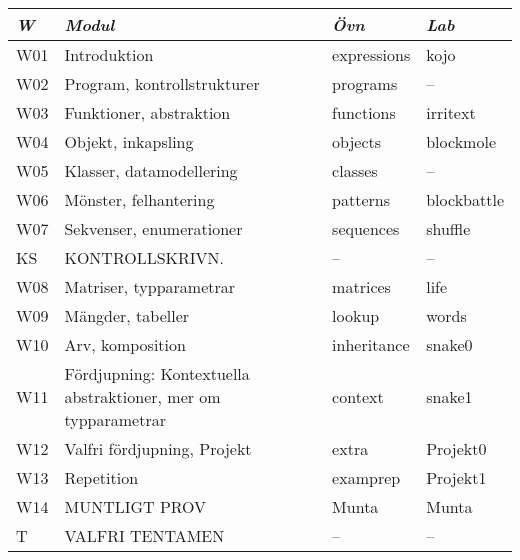 \begin{tabular}{l|l|l|l}
\textit{W} & \textit{Modul} & \textit{Övn} & \textit{Lab} \\ \hline \hline
W01 & Introduktion & expressions & kojo \\
W02 & Program, kontrollstrukturer & programs & -- \\
W03 & Funktioner, abstraktion & functions & irritext \\
W04 & Objekt, inkapsling & objects & blockmole \\
W05 & Klasser, datamodellering & classes & -- \\
W06 & Mönster, felhantering & patterns & blockbattle \\
W07 & Sekvenser, enumerationer & sequences & shuffle \\
KS & KONTROLLSKRIVN. & -- & -- \\
W08 & Matriser, typparametrar & matrices & life \\
W09 & Mängder, tabeller & lookup & words \\
W10 & Arv, komposition & inheritance & snake0 \\
W11 & Fördjupning: Kontextuella abstraktioner, mer om typparametrar & context & snake1 \\
W12 & Valfri fördjupning, Projekt & extra & Projekt0 \\
W13 & Repetition & examprep & Projekt1 \\
W14 & MUNTLIGT PROV & Munta & Munta \\
T & VALFRI TENTAMEN & -- & -- \\
\end{tabular}
